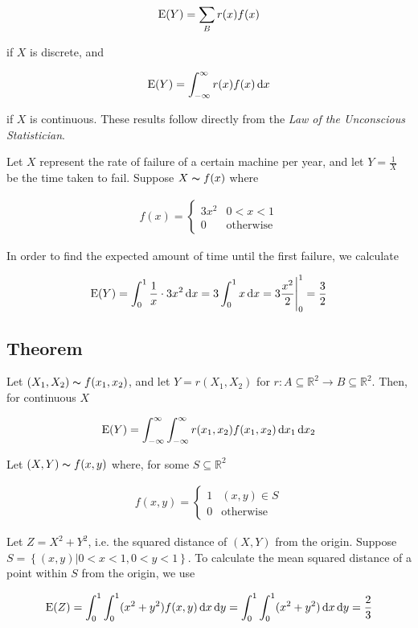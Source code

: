 \begin{align*}
  \mathrm{E}(Y) = \sum_B r(x) f(x)
\end{align*}

if $X$ is discrete, and

\begin{align*}
  \mathrm{E}(Y) = \int_{-\infty}^{\infty} r(x) f(x) \mathop{}\!\mathrm{d} x
\end{align*}

if $X$ is continuous. These results follow directly from the \textit{Law of the Unconscious Statistician}.

\ex
Let $X$ represent the rate of failure of a certain machine per year, and let $Y = \frac{1}{X}$ be the time taken to fail. Suppose $X \thicksim f(x)$ where

\begin{align*}
  f(x) =
  \begin{cases}
    3x^2 & 0 < x < 1 \\
    0 & \text{otherwise}
  \end{cases}
\end{align*}

In order to find the expected amount of time until the first failure, we calculate

\begin{align*}
  \mathrm{E}(Y) = \int_0^1 \frac{1}{x} \cdot 3x^2 \mathop{}\!\mathrm{d} x = 3 \int_0^1 x \mathop{}\!\mathrm{d} x = 3 \frac{x^2}{2} \Bigg|_0^1 = \frac{3}{2}
\end{align*}

\subsection{Theorem}
Let $(X_1, X_2) \thicksim f(x_1, x_2)$, and let $Y = r(X_1, X_2)$ for $r: A \subseteq \mathbb{R}^2 \rightarrow B \subseteq \mathbb{R}^2$. Then, for continuous $X$

\begin{align*}
  \mathrm{E}(Y) = \int_{-\infty}^{\infty} \int_{-\infty}^{\infty} r(x_1, x_2) f(x_1, x_2) \mathop{}\!\mathrm{d} x_1 \mathop{}\!\mathrm{d} x_2
\end{align*}

\ex
Let $(X, Y) \thicksim f(x, y)$ where, for some $S \subseteq \mathbb{R}^2$

\begin{align*}
  f(x, y) =
  \begin{cases}
    1 & (x, y) \in S \\
    0 & \text{otherwise}
  \end{cases}
\end{align*}

Let $Z = X^2 + Y^2$, i.e. the squared distance of $(X, Y)$ from the origin. Suppose $S = \left\{(x, y) | 0 < x < 1, 0 < y < 1\right\}$. To calculate the mean squared distance of a point within $S$ from the origin, we use

\begin{align*}
  \mathrm{E}(Z) = \int_0^1 \int_0^1 (x^2 + y^2) f(x, y) \mathop{}\!\mathrm{d} x \mathop{}\!\mathrm{d} y = \int_0^1 \int_0^1 (x^2 + y^2) \mathop{}\!\mathrm{d} x \mathop{}\!\mathrm{d} y = \frac{2}{3}
\end{align*}


